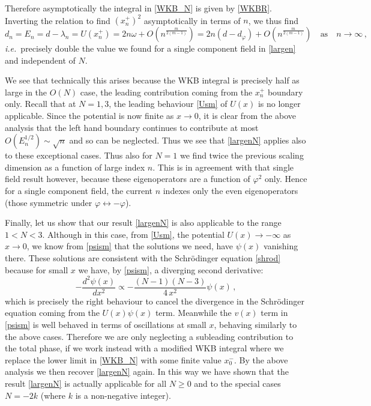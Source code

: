 \documentclass[11pt,a4paper]{article}
\numberwithin{figure}{section}
\numberwithin{equation}{section}
\newcommand{\be}{\begin{equation}}
\newcommand{\ee}{\end{equation}}
\newcommand\ie{\textit{i.e.}\ }
\newcommand{\ph}{\varphi}
\begin{document}
Therefore asymptotically the integral in \eqref{WKB_N} is given by \eqref{WKBR}. Inverting the relation to find $(x^+_n)^2$ asymptotically in terms of $n$, we thus find 
\be
\label{largenN}
d_n=E_n=d-\lambda_n=U(x^+_n) = 2n\omega + O\left( n^\frac{m}{2(m-1)} \right) = 2n(d-d_\ph) + O\left( n^\frac{m}{2(m-1)} \right) \quad \text{as} \quad n \rightarrow \infty \,,
\ee
\ie precisely double the value we found for a single component field in \eqref{largen} and independent of $N$.

We see that technically this arises because the WKB integral is precisely half as large in the $O(N)$ case, the leading contribution coming from the $x^+_n$ boundary only. Recall that at $N=1,3$, the leading behaviour \eqref{Usm} of $U(x)$ is no longer applicable. Since the potential is now finite as $x\to0$, it is clear from the above analysis that the left hand boundary continues to contribute at most $O(E^{1/2}_n)\sim\sqrt{n}$ and so can be neglected. Thus we see that \eqref{largenN} applies also to these exceptional cases. Thus also for $N=1$ we find twice the previous scaling dimension as a function of large index $n$. This is in agreement with that single field result however, because these eigenoperators are a function of $\ph^2$ only. Hence for a single component field, the current $n$ indexes only the even eigenoperators (those symmetric under $\ph\leftrightarrow-\ph$).

Finally, let us show that our result \eqref{largenN} is also applicable to the range $1<N<3$.  Although in this case, from \eqref{Usm}, the potential $U(x)\to-\infty$ as $x\to0$, we know from \eqref{psism} that the solutions we need, have $\psi(x)$ vanishing there. These solutions are consistent with the Schr\"odinger equation \eqref{shrod} because for small $x$ we have, by \eqref{psism}, a diverging second derivative:
\be -\frac{d^2\psi(x)}{dx^2} \propto -\frac{(N-1)(N-3)}{4\,x^2}\psi(x)\,,\ee
which is precisely the right behaviour to cancel the divergence in the Schr\"odinger equation coming from the $U(x)\psi(x)$ term. Meanwhile the $v(x)$ term in \eqref{psism} is well behaved in terms of oscillations at small $x$, behaving similarly to the above cases. Therefore we are only neglecting a subleading contribution to the total phase, if we work instead with a modified WKB integral where we replace the lower limit in \eqref{WKB_N} with some finite value $x^-_0$. By the above analysis we then recover \eqref{largenN} again. In this way we have shown that the result \eqref{largenN} is actually applicable for all $N\ge0$ and to the special cases $N=-2k$ (where $k$ is a non-negative integer).
\end{document}
